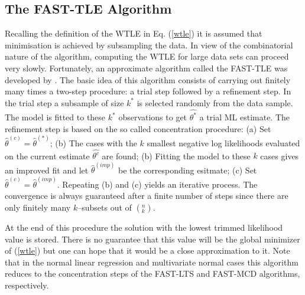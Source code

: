 \documentclass[article,shortnames,nojss]{jss}
\begin{document}
\subsection{The FAST-TLE Algorithm}
\label{sec:fast-tle}

Recalling the definition of the WTLE in Eq. (\ref{wtle}) it is assumed that minimisation is achieved by subsampling the data. In view of the combinatorial nature of the algorithm, computing the WTLE for large data sets can proceed very slowly. Fortunately, an approximate algorithm called the FAST-TLE was developed by \cite{NM2003}.
The basic idea of this algorithm consists of carrying out finitely many times a two-step procedure: a trial step followed by a refinement step. In the trial step a subsample of size $k^{*}$ is selected
randomly from the data sample. The model is fitted to these $k^{*}$ observations to get $\hat{\theta^{*}}$ a trial ML estimate.  The refinement step is based on the so called concentration procedure: (a) Set $\hat{\theta}^{(c)}=\hat{\theta}^{(*)}$; (b) The cases with the $k$ smallest negative log likelihoods evaluated on the current estimate $\hat{\theta^{c}}$ are found; (b) Fitting the model to these $k$ cases gives an improved fit and let  $\hat{\theta}^{(imp)}$ be the corresponding esitmate; (c) Set $\hat{\theta}^{(c)}=\hat{\theta}^{(imp)}$. Repeating (b) and (c) yields an iterative process. The convergence is always  guaranteed after a finite number of steps since there are only finitely many $k$--subsets out of $(^{n}_{k})$.

At the end of this procedure the solution with  the lowest trimmed likelihood value is stored.  There is no guarantee that this value will be the global minimizer of (\ref{wtle}) but one can hope that it would be a close
approximation to it.
Note that in the normal linear regression and multivariate normal cases this algorithm
reduces to the concentration steps of the FAST-LTS and FAST-MCD algorithms,
respectively.
\end{document}
